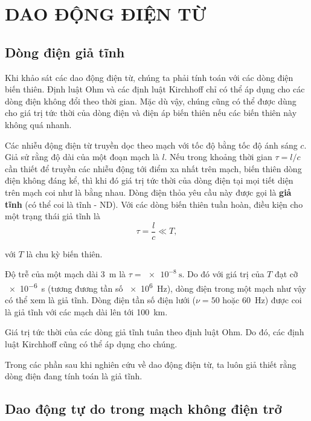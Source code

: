 

\chapter[DAO ĐỘNG ĐIỆN TỪ]{DAO ĐỘNG ĐIỆN TỪ}\label{chap:13}

\section{Dòng điện giả tĩnh}\label{sec:13_1}

Khi khảo sát các dao động điện từ, chúng ta phải tính toán với các dòng điện biến thiên.
Định luật Ohm và các định luật Kirchhoff chỉ có thể áp dụng cho các dòng điện không đổi theo thời gian.
Mặc dù vậy, chúng cũng có thể được dùng cho giá trị tức thời của dòng điện và điện áp biến thiên nếu các biến thiên này không quá nhanh.

Các nhiễu động điện từ truyền dọc theo mạch với tốc độ bằng tốc độ ánh sáng $c$.
Giả sử rằng độ dài của một đoạn mạch là $l$.
Nếu trong khoảng thời gian $\tau=l/c$ cần thiết để truyền các nhiễu động tới điểm xa nhất trên mạch, biến thiên dòng điện không đáng kể, thì khi đó giá trị tức thời của dòng điện tại mọi tiết diện trên mạch coi như là bằng nhau.
Dòng điện thỏa yêu cầu này được gọi là \textbf{giả tĩnh} (có thể coi là tĩnh - ND).
Với các dòng biến thiên tuần hoàn, điều kiện cho một trạng thái giả tĩnh là
\begin{equation*}
    \tau = \frac{l}{c} \ll T,
\end{equation*}

\noindent
với $T$ là chu kỳ biến thiên.

Độ trễ của một mạch dài \SI{3}{\metre} là $\tau=\SI{e-8}{\second}$.
Do đó với giá trị của $T$ đạt cỡ \SI{e-6}{\second} (tương đương tần số \SI{e6}{\hertz}), dòng điện trong một mạch như vậy có thể xem là giả tĩnh.
Dòng điện tần số điện lưới ($\nu= 50$ hoặc \SI{60}{\hertz}) được coi là giả tĩnh với các mạch dài lên tới \SI{100}{\kilo\metre}.

Giá trị tức thời của các dòng giả tĩnh tuân theo định luật Ohm.
Do đó, các định luật Kirchhoff cũng có thể áp dụng cho chúng.

Trong các phần sau khi nghiên cứu về dao động điện từ, ta luôn giả thiết rằng dòng điện đang tính toán là giả tĩnh.

\section{Dao động tự do trong mạch không điện trở}\label{sec:13_2}


